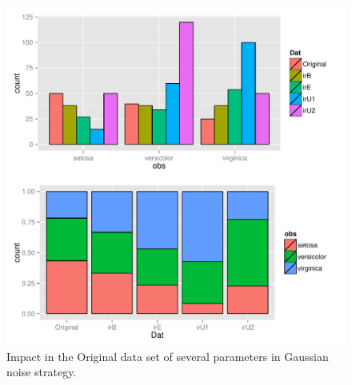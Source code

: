 \documentclass[10pt,a4paper]{article}\usepackage[]{graphicx}\usepackage[]{color}
\makeatletter
\def\maxwidth{ %
  \ifdim\Gin@nat@width>\linewidth
    \linewidth
  \else
    \Gin@nat@width
  \fi
}
\newenvironment{knitrout}{}{} %
\makeatother
\begin{document}
\begin{knitrout}\footnotesize
{}\color{fgcolor}\begin{figure}

{\centering \includegraphics[width=\maxwidth,height=0.5\textheight]{figures/UBL-ir_GN_plot-1} 

}

\caption[Impact in the Original data set of several parameters in Gaussian noise strategy]{Impact in the Original data set of several parameters in Gaussian noise strategy. }\label{fig:ir_GN_plot}
\end{figure}


\end{knitrout}
\end{document}
